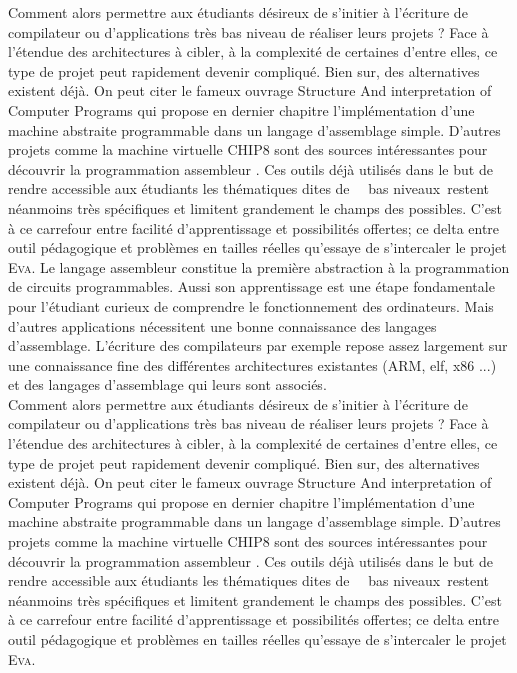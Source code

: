 \documentclass[11pt,twoside]{article}
\makeatletter
\providecommand{\og}{\leavevmode\flqq~}%
\providecommand{\fg}{\ifdim\lastskip>\z@\unskip\fi~\frqq}%
\newcommand{\noun}[1]{\textsc{#1}}
\makeatother
\begin{document}
Comment alors permettre aux étudiants désireux de s'initier à l'écriture de compilateur ou d'applications très bas niveau de réaliser leurs projets ? Face à l'étendue des architectures à cibler, à la complexité de certaines d’entre elles, ce type de projet peut rapidement devenir compliqué. Bien sur, des alternatives existent déjà. On peut citer le fameux ouvrage Structure And interpretation of Computer Programs \cite{SICP} qui propose en dernier chapitre l'implémentation d'une machine abstraite programmable dans un langage d'assemblage simple. D'autres projets comme la machine virtuelle CHIP8 sont des sources intéressantes pour découvrir la programmation assembleur \cite{CHIP8}. Ces outils déjà utilisés dans le but de rendre accessible aux étudiants les thématiques dites de \og~bas niveaux\fg restent néanmoins très spécifiques et limitent grandement le champs des possibles. C'est à ce carrefour entre facilité d'apprentissage et possibilités offertes; ce delta entre outil pédagogique et problèmes en tailles réelles qu'essaye de s'intercaler le projet \noun{Eva}.
Le langage assembleur constitue la première abstraction à la programmation
de circuits programmables. Aussi son apprentissage est une étape fondamentale pour l'étudiant curieux de comprendre le fonctionnement des ordinateurs. Mais d'autres applications nécessitent une bonne connaissance des langages d'assemblage. L'écriture des compilateurs par exemple repose assez largement sur une connaissance fine des différentes architectures existantes (ARM, elf, x86 ...) et des langages d'assemblage qui leurs sont associés. \\

Comment alors permettre aux étudiants désireux de s'initier à l'écriture de compilateur ou d'applications très bas niveau de réaliser leurs projets ? Face à l'étendue des architectures à cibler, à la complexité de certaines d’entre elles, ce type de projet peut rapidement devenir compliqué. Bien sur, des alternatives existent déjà. On peut citer le fameux ouvrage Structure And interpretation of Computer Programs \cite{SICP} qui propose en dernier chapitre l'implémentation d'une machine abstraite programmable dans un langage d'assemblage simple. D'autres projets comme la machine virtuelle CHIP8 sont des sources intéressantes pour découvrir la programmation assembleur \cite{CHIP8}. Ces outils déjà utilisés dans le but de rendre accessible aux étudiants les thématiques dites de \og~bas niveaux\fg restent néanmoins très spécifiques et limitent grandement le champs des possibles. C'est à ce carrefour entre facilité d'apprentissage et possibilités offertes; ce delta entre outil pédagogique et problèmes en tailles réelles qu'essaye de s'intercaler le projet \noun{Eva}. \\
\end{document}
